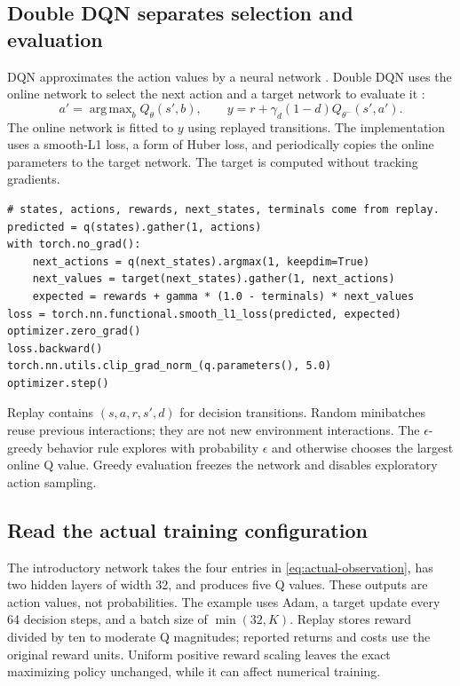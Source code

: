 \documentclass[11pt,a4paper]{article}
\DeclareMathOperator*{\argmax}{arg\,max}
\theoremstyle{definition}
\theoremstyle{remark}
\begin{document}
\subsection{Double DQN separates selection and evaluation}
DQN approximates the action values by a neural network \cite{mnih}. Double DQN uses the online network to select the next action and a target network to evaluate it \cite{ddqn}:
\begin{equation}
a'=\argmax_bQ_\theta(s',b),\qquad
y=r+\gamma_d(1-d)Q_{\theta^-}(s',a').
\label{eq:ddqn-target}
\end{equation}
The online network is fitted to $y$ using replayed transitions. The implementation uses a smooth-L1 loss, a form of Huber loss, and periodically copies the online parameters to the target network. The target is computed without tracking gradients.

\begin{lstlisting}[caption={The learning update in mathematical order}]
# states, actions, rewards, next_states, terminals come from replay.
predicted = q(states).gather(1, actions)
with torch.no_grad():
    next_actions = q(next_states).argmax(1, keepdim=True)
    next_values = target(next_states).gather(1, next_actions)
    expected = rewards + gamma * (1.0 - terminals) * next_values
loss = torch.nn.functional.smooth_l1_loss(predicted, expected)
optimizer.zero_grad()
loss.backward()
torch.nn.utils.clip_grad_norm_(q.parameters(), 5.0)
optimizer.step()
\end{lstlisting}

Replay contains $(s,a,r,s',d)$ for decision transitions. Random minibatches reuse previous interactions; they are not new environment interactions. The $\epsilon$-greedy behavior rule explores with probability $\epsilon$ and otherwise chooses the largest online Q value. Greedy evaluation freezes the network and disables exploratory action sampling.

\subsection{Read the actual training configuration}
The introductory network takes the four entries in \eqref{eq:actual-observation}, has two hidden layers of width 32, and produces five Q values. These outputs are action values, not probabilities. The example uses Adam, a target update every 64 decision steps, and a batch size of $\min(32,K)$. Replay stores reward divided by ten to moderate Q magnitudes; reported returns and costs use the original reward units. Uniform positive reward scaling leaves the exact maximizing policy unchanged, while it can affect numerical training.
\end{document}
